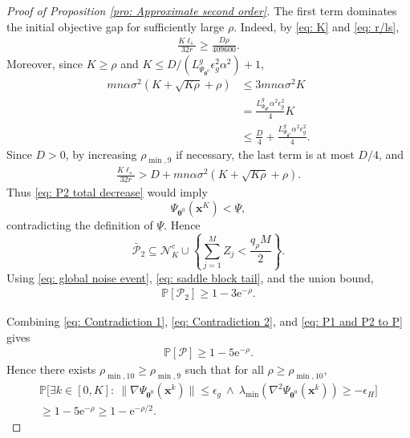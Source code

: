 \documentclass{siamart251216}
\begin{document}
\begin{proof}[Proof of Proposition \ref{pro: Approximate second order}]
    The first term dominates the initial objective gap for sufficiently large $\rho$. Indeed, by \eqref{eq: K} and \eqref{eq: r/ls},
    \begin{gather*}
        \frac{K\ell_s}{32r}
        \geq
        \frac{D\rho}{409600}.
    \end{gather*}
    Moreover, since $K\geq\rho$ and $K\leq D/(L_{\Psi_{\boldsymbol{\theta}^{0}}}^{g}\epsilon_g^{2}\alpha^{2})+1$,
    \begin{align*}
        mn\alpha\sigma^{2}(K+\sqrt{K\rho}+\rho)
        &\leq3mn\alpha\sigma^{2}K\\
        &=\frac{L_{\Psi_{\boldsymbol{\theta}^{0}}}^{g}\alpha^{2}\epsilon_g^{2}}{4}K\\
        &\leq\frac{D}{4}
        +\frac{L_{\Psi_{\boldsymbol{\theta}^{0}}}^{g}\alpha^{2}\epsilon_g^{2}}{4}.
    \end{align*}
    Since $D>0$, by increasing $\rho_{\min,9}$ if necessary, the last term is at most $D/4$, and
    \begin{gather*}
        \frac{K\ell_s}{32r}
        >
        D+mn\alpha\sigma^{2}(K+\sqrt{K\rho}+\rho).
    \end{gather*}
    Thus \eqref{eq: P2 total decrease} would imply
    \[
        \Psi_{\boldsymbol{\theta}^{0}}(\mathbf{x}^{K})<\underline{\Psi},
    \]
    contradicting the definition of $\underline{\Psi}$. Hence
    \[
        \bar{\mathcal{P}}_{2}
        \subseteq
        \mathcal{N}_{K}^{c}
        \cup
        \left\{\sum_{j=1}^{M}Z_j<\frac{q_{\rho}M}{2}\right\}.
    \]
    Using \eqref{eq: global noise event}, \eqref{eq: saddle block tail}, and the union bound,
    \begin{gather}
        \label{eq: Contradiction 2}
        \mathbb{P}[\mathcal{P}_{2}]
        \geq1-3\mathrm{e}^{-\rho}.
    \end{gather}

    Combining \eqref{eq: Contradiction 1}, \eqref{eq: Contradiction 2}, and \eqref{eq: P1 and P2 to P} gives
    \begin{gather*}
        \mathbb{P}[\mathcal{P}]
        \geq1-5\mathrm{e}^{-\rho}.
    \end{gather*}
    Hence there exists $\rho_{\min,10}\geq\rho_{\min,9}$ such that for all $\rho\geq\rho_{\min,10}$,
    \begin{multline}
        \label{eq: Approximately second order staionarity}
        \mathbb{P}\Big[\exists k\in[0,K]:~
        \|\nabla\Psi_{\boldsymbol{\theta}^{0}}(\mathbf{x}^{k})\|\leq\epsilon_g
        \ \land\
        \lambda_{\min}(\nabla^{2}\Psi_{\boldsymbol{\theta}^{0}}(\mathbf{x}^{k}))\geq-\epsilon_H\Big]\\
        \geq1-5\mathrm{e}^{-\rho}
        \geq1-\mathrm{e}^{-\rho/2}.
    \end{multline}


\end{proof}
\end{document}
